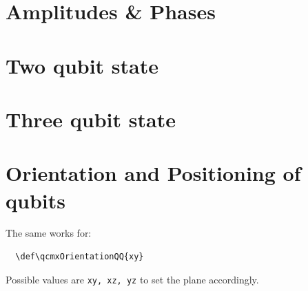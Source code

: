 \documentclass{article}
\begin{document}

\begin{center}
  
\end{center}


\begin{center}
  
\end{center}

\section*{Amplitudes \& Phases}

\begin{center}
  
\end{center}


\begin{center}
  
\end{center}

\pagebreak
\section*{Two qubit state}

\begin{center}
  
\end{center}

\pagebreak
\section*{Three qubit state}

\resizebox{\textwidth}{!}{
  \hspace{-22cm}
  
  \hspace{2cm}
}

\pagebreak
\section*{Orientation and Positioning of qubits}

\resizebox{\textwidth}{!}{
  \hspace{-22cm}
  
  \hspace{2cm}
}

The same works for:
\begin{lstlisting}
  \def\qcmxOrientationQQ{xy}
\end{lstlisting}
Possible values are \lstinline|xy, xz, yz| to set the plane accordingly.
\end{document}
